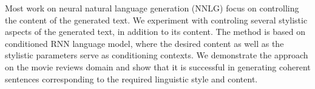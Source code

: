 Most work on neural natural language generation (NNLG) focus on controlling the content of the generated text. We experiment with controling several stylistic aspects of the generated text, in addition to its content. The method is based on conditioned RNN language model, where the desired content as well as the stylistic parameters serve as conditioning contexts. We demonstrate the approach on the movie reviews domain and show that it is successful in generating coherent sentences corresponding to the required linguistic style and content.

